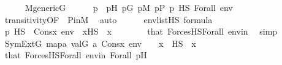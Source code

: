 \begin{isabellebody}
\ \ \ \ \isamarkupfalse%
\ {\isacartoucheopen}M{\isacharunderscore}{\kern0pt}generic{\isacharparenleft}{\kern0pt}G{\isacharparenright}{\kern0pt}{\isacartoucheclose}\isanewline
\ \ \ \ \isamarkupfalse%
\ p\ \ pH{\isacharcolon}{\kern0pt}\ {\isachardoublequoteopen}p{\isasymin}G{\isachardoublequoteclose}\ {\isachardoublequoteopen}p{\isasymin}M{\isachardoublequoteclose}\ {\isachardoublequoteopen}p{\isasymin}P{\isachardoublequoteclose}\ {\isachardoublequoteopen}p\ {\isasymtturnstile}HS\ Forall{\isacharparenleft}{\kern0pt}{\isasymphi}{\isacharparenright}{\kern0pt}\ env{\isachardoublequoteclose}\isanewline
\ \ \ \ \ \ \isamarkupfalse%
\ transitivity{\isacharbrackleft}{\kern0pt}OF\ {\isacharunderscore}{\kern0pt}\ P{\isacharunderscore}{\kern0pt}in{\isacharunderscore}{\kern0pt}M{\isacharbrackright}{\kern0pt}\ \isamarkupfalse%
\ auto\isanewline
\ \ \ \ \isamarkupfalse%
\ {\isacartoucheopen}env{\isasymin}list{\isacharparenleft}{\kern0pt}HS{\isacharparenright}{\kern0pt}{\isacartoucheclose}\ {\isacartoucheopen}{\isasymphi}{\isasymin}formula{\isacartoucheclose}\isanewline
\ \ \ \ \isamarkupfalse%
\ {\isachardoublequoteopen}p\ {\isasymtturnstile}HS\ {\isasymphi}\ {\isacharparenleft}{\kern0pt}Cons{\isacharparenleft}{\kern0pt}x{\isacharcomma}{\kern0pt}\ env{\isacharparenright}{\kern0pt}{\isacharparenright}{\kern0pt}{\isachardoublequoteclose}\ \ {\isachardoublequoteopen}x{\isasymin}HS{\isachardoublequoteclose}\ \ x\isanewline
\ \ \ \ \ \ \isamarkupfalse%
\ that\ ForcesHS{\isacharunderscore}{\kern0pt}Forall\ envin\ \isamarkupfalse%
\ simp\isanewline
\ \ \ \ \isamarkupfalse%
\ \isamarkupfalse%
\ {\isachardoublequoteopen}SymExt{\isacharparenleft}{\kern0pt}G{\isacharparenright}{\kern0pt}{\isacharcomma}{\kern0pt}\ map{\isacharparenleft}{\kern0pt}{\isasymlambda}a{\isachardot}{\kern0pt}\ val{\isacharparenleft}{\kern0pt}G{\isacharcomma}{\kern0pt}\ a{\isacharparenright}{\kern0pt}{\isacharcomma}{\kern0pt}\ Cons{\isacharparenleft}{\kern0pt}x{\isacharcomma}{\kern0pt}\ env{\isacharparenright}{\kern0pt}{\isacharparenright}{\kern0pt}\ {\isasymTurnstile}\ {\isasymphi}{\isachardoublequoteclose}\ \ {\isachardoublequoteopen}x\ {\isasymin}\ HS{\isachardoublequoteclose}\ \ x\ \isanewline
\ \ \ \ \ \ \isamarkupfalse%
\ that\ ForcesHS{\isacharunderscore}{\kern0pt}Forall\ envin\ Forall\ pH\ \isanewline
\ \ \ \ \ \ \isamarkupfalse%

\end{isabellebody}
